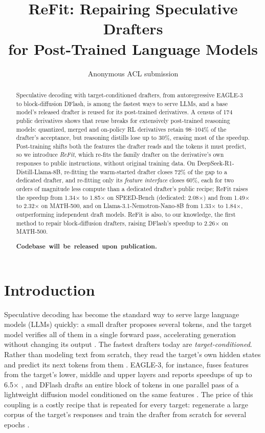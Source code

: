 \documentclass[11pt]{article}
\title{ReFit: Repairing Speculative Drafters\\for Post-Trained Language Models}
\author{Anonymous ACL submission}
\newcommand{\refit}{ReFit}
\begin{document}
\maketitle

\begin{abstract}
Speculative decoding with target-conditioned drafters, from autoregressive EAGLE-3 to block-diffusion DFlash, is among the fastest ways to serve LLMs, and a base model's released drafter is reused for its post-trained derivatives.
A census of 174 public derivatives shows that reuse breaks for extensively post-trained reasoning models: quantized, merged and on-policy RL derivatives retain 98--104\% of the drafter's acceptance, but reasoning distills lose up to 30\%, erasing most of the speedup.
Post-training shifts both the features the drafter reads and the tokens it must predict, so we introduce \emph{\refit{}}, which re-fits the family drafter on the derivative's own responses to public instructions, without original training data.
On DeepSeek-R1-Distill-Llama-8B, re-fitting the warm-started drafter closes 72\% of the gap to a dedicated drafter, and re-fitting only its \emph{feature interface} closes 60\%, each for two orders of magnitude less compute than a dedicated drafter's public recipe; \refit{} raises the speedup from 1.34$\times$ to 1.85$\times$ on SPEED-Bench (dedicated: 2.08$\times$) and from 1.49$\times$ to 2.32$\times$ on MATH-500, and on Llama-3.1-Nemotron-Nano-8B from 1.33$\times$ to 1.84$\times$, outperforming independent draft models.
\refit{} is also, to our knowledge, the first method to repair block-diffusion drafters, raising DFlash's speedup to 2.26$\times$ on MATH-500.

\noindent\mbox{\textbf{Codebase will be released upon publication.}}
\end{abstract}

\section{Introduction}

Speculative decoding has become the standard way to serve large language models (LLMs) quickly: a small drafter proposes several tokens, and the target model verifies all of them in a single forward pass, accelerating generation without changing its output \citep{leviathan2023speculative,chen2023accelerating}.
The fastest drafters today are \emph{target-conditioned}.
Rather than modeling text from scratch, they read the target's own hidden states and predict its next tokens from them \citep{cai2024medusa,li2024eagle,li2025eagle3,chen2026dflash}.
EAGLE-3, for instance, fuses features from the target's lower, middle and upper layers and reports speedups of up to 6.5$\times$ \citep{li2025eagle3}, and DFlash drafts an entire block of tokens in one parallel pass of a lightweight diffusion model conditioned on the same features \citep{chen2026dflash}.
The price of this coupling is a costly recipe that is repeated for every target: regenerate a large corpus of the target's responses and train the drafter from scratch for several epochs \citep{li2026specforge,redhat2025speculators}.
\end{document}
